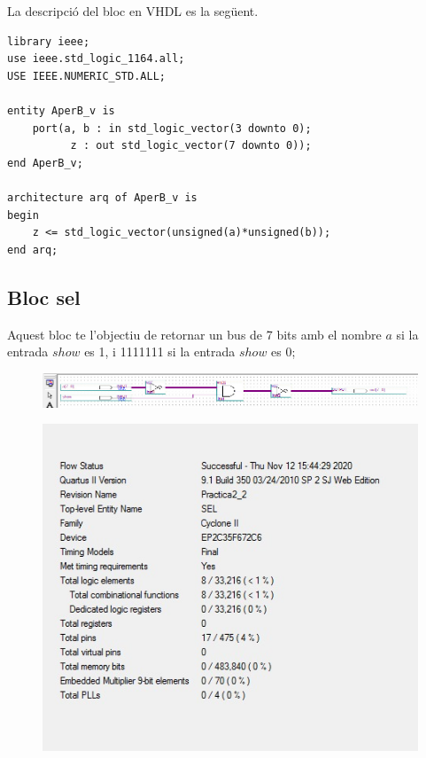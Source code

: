 \documentclass[12pt, a4papre]{article}
\begin{document}
	La descripció del bloc en VHDL es la següent.
	
	\begin{lstlisting}[style=vhdl, frame=single, basicstyle=\small]
library ieee;
use ieee.std_logic_1164.all;
USE IEEE.NUMERIC_STD.ALL;

entity AperB_v is
	port(a, b : in std_logic_vector(3 downto 0);
		  z : out std_logic_vector(7 downto 0));
end AperB_v;

architecture arq of AperB_v is
begin
	z <= std_logic_vector(unsigned(a)*unsigned(b));
end arq;
\end{lstlisting}
	
	\subsection{Bloc sel}
	
	Aquest bloc te l'objectiu de retornar un bus de 7 bits amb el nombre $a$ si la entrada $show$ es 1, i 1111111 si la entrada $show$ es 0;
	\begin{figure}[H]
		\begin{center}
		\includegraphics[width=130mm]{SEL.jpeg}
		\end{center}
	\end{figure}
	
	\begin{figure}[H]
		\begin{center}
		\includegraphics[width=130mm]{informeSEL.jpeg}
		\end{center}
	\end{figure}
	
\end{document}
